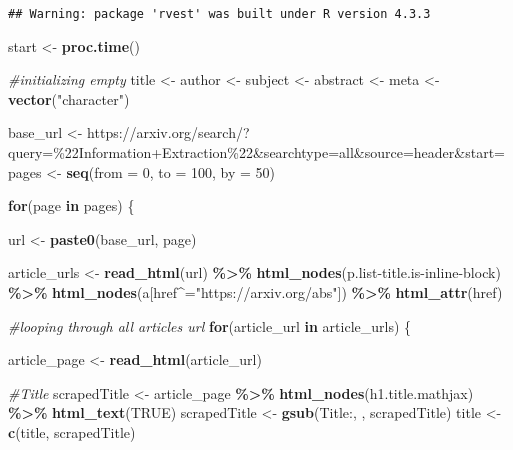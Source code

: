 \documentclass[
]{article}
\newenvironment{Shaded}{\begin{snugshade}}{\end{snugshade}}
\newcommand{\AttributeTok}[1]{\textcolor[rgb]{0.13,0.29,0.53}{#1}}
\newcommand{\CommentTok}[1]{\textcolor[rgb]{0.56,0.35,0.01}{\textit{#1}}}
\newcommand{\ConstantTok}[1]{\textcolor[rgb]{0.56,0.35,0.01}{#1}}
\newcommand{\ControlFlowTok}[1]{\textcolor[rgb]{0.13,0.29,0.53}{\textbf{#1}}}
\newcommand{\DecValTok}[1]{\textcolor[rgb]{0.00,0.00,0.81}{#1}}
\newcommand{\FunctionTok}[1]{\textcolor[rgb]{0.13,0.29,0.53}{\textbf{#1}}}
\newcommand{\NormalTok}[1]{#1}
\newcommand{\OtherTok}[1]{\textcolor[rgb]{0.56,0.35,0.01}{#1}}
\newcommand{\SpecialCharTok}[1]{\textcolor[rgb]{0.81,0.36,0.00}{\textbf{#1}}}
\newcommand{\StringTok}[1]{\textcolor[rgb]{0.31,0.60,0.02}{#1}}
\begin{document}
\begin{verbatim}
## Warning: package 'rvest' was built under R version 4.3.3
\end{verbatim}

\begin{Shaded}
\begin{Highlighting}[]
\NormalTok{start }\OtherTok{\textless{}{-}} \FunctionTok{proc.time}\NormalTok{()}

\CommentTok{\#initializing empty}
\NormalTok{title }\OtherTok{\textless{}{-}}\NormalTok{ author }\OtherTok{\textless{}{-}}\NormalTok{ subject }\OtherTok{\textless{}{-}}\NormalTok{ abstract }\OtherTok{\textless{}{-}}\NormalTok{ meta }\OtherTok{\textless{}{-}} \FunctionTok{vector}\NormalTok{(}\StringTok{"character"}\NormalTok{)}

\NormalTok{base\_url }\OtherTok{\textless{}{-}} \StringTok{\textquotesingle{}https://arxiv.org/search/?query=\%22Information+Extraction\%22\&searchtype=all\&source=header\&start=\textquotesingle{}}
\NormalTok{pages }\OtherTok{\textless{}{-}} \FunctionTok{seq}\NormalTok{(}\AttributeTok{from =} \DecValTok{0}\NormalTok{, }\AttributeTok{to =} \DecValTok{100}\NormalTok{, }\AttributeTok{by =} \DecValTok{50}\NormalTok{)}

\ControlFlowTok{for}\NormalTok{(page }\ControlFlowTok{in}\NormalTok{ pages) \{}
  
\NormalTok{  url }\OtherTok{\textless{}{-}} \FunctionTok{paste0}\NormalTok{(base\_url, page)}

\NormalTok{  article\_urls }\OtherTok{\textless{}{-}} \FunctionTok{read\_html}\NormalTok{(url) }\SpecialCharTok{\%\textgreater{}\%} 
    \FunctionTok{html\_nodes}\NormalTok{(}\StringTok{\textquotesingle{}p.list{-}title.is{-}inline{-}block\textquotesingle{}}\NormalTok{) }\SpecialCharTok{\%\textgreater{}\%} 
    \FunctionTok{html\_nodes}\NormalTok{(}\StringTok{\textquotesingle{}a[href\^{}="https://arxiv.org/abs"]\textquotesingle{}}\NormalTok{) }\SpecialCharTok{\%\textgreater{}\%} 
    \FunctionTok{html\_attr}\NormalTok{(}\StringTok{\textquotesingle{}href\textquotesingle{}}\NormalTok{)}
  
  
  \CommentTok{\#looping through all articles url}
  \ControlFlowTok{for}\NormalTok{(article\_url }\ControlFlowTok{in}\NormalTok{ article\_urls) \{}
  
\NormalTok{    article\_page }\OtherTok{\textless{}{-}} \FunctionTok{read\_html}\NormalTok{(article\_url)}

    \CommentTok{\#Title}
\NormalTok{    scrapedTitle }\OtherTok{\textless{}{-}}\NormalTok{ article\_page }\SpecialCharTok{\%\textgreater{}\%} \FunctionTok{html\_nodes}\NormalTok{(}\StringTok{\textquotesingle{}h1.title.mathjax\textquotesingle{}}\NormalTok{) }\SpecialCharTok{\%\textgreater{}\%} \FunctionTok{html\_text}\NormalTok{(}\ConstantTok{TRUE}\NormalTok{)}
\NormalTok{    scrapedTitle }\OtherTok{\textless{}{-}} \FunctionTok{gsub}\NormalTok{(}\StringTok{\textquotesingle{}Title:\textquotesingle{}}\NormalTok{, }\StringTok{\textquotesingle{}\textquotesingle{}}\NormalTok{, scrapedTitle)}
\NormalTok{    title }\OtherTok{\textless{}{-}} \FunctionTok{c}\NormalTok{(title, scrapedTitle)}
    

\end{Highlighting}
\end{Shaded}
\end{document}
